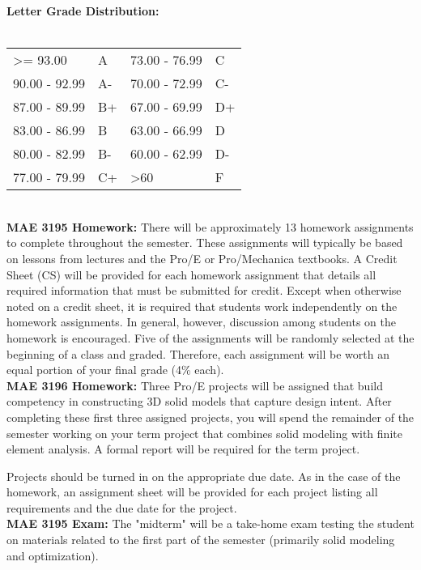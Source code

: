 \documentclass[11pt]{article}
\begin{document}
\textbf{\large Letter Grade Distribution:} \\\\
\hspace*{40mm}
\begin{tabular}{ l l | l l }
\textgreater= 93.00 & A & 73.00 - 76.99 & C \\
90.00 - 92.99 & A-  & 70.00 - 72.99 & C- \\
87.00 - 89.99 & B+  & 67.00 - 69.99 & D+ \\
83.00 - 86.99 & B  & 63.00 - 66.99 & D \\
80.00 - 82.99 & B-  & 60.00 - 62.99 & D- \\
77.00 - 79.99 & C+  & \textgreater 60 & F \\
\end{tabular} \\

\textbf{\large MAE 3195 Homework:}
There will be approximately 13 homework assignments to complete throughout the semester. These assignments will typically be based on lessons from lectures and the Pro/E or Pro/Mechanica textbooks. A Credit Sheet (CS) will be provided for each homework assignment that details all required information that must be submitted for credit. Except when otherwise noted on a credit sheet, it is required that students work independently on the homework assignments. In general, however, discussion among students on the homework is encouraged. Five of the assignments will be randomly selected at the beginning of a class and graded. Therefore, each assignment will be worth an equal portion of your final grade (4\% each). \\

\textbf{\large MAE 3196 Homework:}
Three Pro/E projects will be assigned that build competency in constructing 3D solid models that capture design intent. After completing these first three assigned projects, you will spend the remainder of the semester working on your term project that combines solid modeling with finite element analysis. A formal report will be required for the term project. 

Projects should be turned in on the appropriate due date. As in the case of the homework, an assignment sheet will be provided for each project listing all requirements and the due date for the project. \\

\textbf{\large MAE 3195 Exam:}
The "midterm" will be a take-home exam testing the student on materials related to the first part of the semester (primarily solid modeling and optimization).\\
\end{document}
